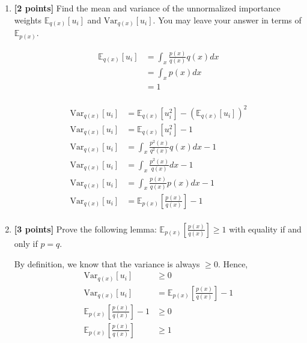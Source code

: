 \documentclass[10pt]{article}
\begin{document}
\begin{enumerate}
    \item \textbf{[2 points]} Find the mean and variance of the unnormalized importance weights $\mathbb{E}_{q(x)}[u_i]$ and $\textrm{Var}_{q(x)}[u_i]$. You may leave your answer in terms of $\mathbb{E}_{p(x)}$.

\begin{solution}
    \begin{align*}
        \mathbb{E}_{q(x)}[u_i] &= \int_{x}\frac{p(x)}{q(x)}q(x)dx \\
        &= \int_{x}p(x)dx \\
        &= 1 \\
    \end{align*}

    \begin{align*}
        \textrm{Var}_{q(x)}[u_i] &= \mathbb{E}_{q(x)}[u_i^2] - \left(\mathbb{E}_{q(x)}[u_i]\right)^2\\
        \textrm{Var}_{q(x)}[u_i] &= \mathbb{E}_{q(x)}[u_i^2] - 1 \\
        \textrm{Var}_{q(x)}[u_i] &= \int_{x}\frac{p^2(x)}{q^2(x)}q(x)dx - 1 \\
        \textrm{Var}_{q(x)}[u_i] &= \int_{x}\frac{p^2(x)}{q(x)}dx - 1 \\
        \textrm{Var}_{q(x)}[u_i] &= \int_{x}\frac{p(x)}{q(x)}p(x)dx - 1 \\
        \textrm{Var}_{q(x)}[u_i] &= \mathbb{E}_{p(x)}\left[\frac{p(x)}{q(x)}\right] - 1 \\
    \end{align*}
\end{solution}

    \item \textbf{[3 points]} Prove the following lemma: $\mathbb{E}_{p(x)} \left[\frac{p(x)}{q(x)} \right] \ge 1$ with equality if and only if $p=q$.

\begin{solution}
    By definition, we know that the variance is always $\ge 0$. Hence,
    \begin{align*}
        \textrm{Var}_{q(x)}[u_i] &\ge 0 \\
        \textrm{Var}_{q(x)}[u_i] &= \mathbb{E}_{p(x)}\left[\frac{p(x)}{q(x)}\right] - 1 \\
        \mathbb{E}_{p(x)}\left[\frac{p(x)}{q(x)}\right] - 1 &\ge 0 \\
        \mathbb{E}_{p(x)}\left[\frac{p(x)}{q(x)}\right] &\ge 1 \\
    \end{align*}


\end{solution}
\end{enumerate}
\end{document}
